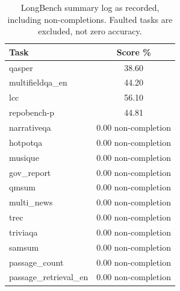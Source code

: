 \begin{table}[t]
\centering\small
\caption{LongBench summary log as recorded, including non-completions. Faulted tasks are excluded, not zero accuracy.}
\label{tab:downstream_results}
\begin{tabular}{@{}lc@{}}
\toprule
Task & Score \% \\
\midrule
qasper & 38.60 \\
multifieldqa\_en & 44.20 \\
lcc & 56.10 \\
repobench-p & 44.81 \\
narrativeqa & 0.00 non-completion \\
hotpotqa & 0.00 non-completion \\
musique & 0.00 non-completion \\
gov\_report & 0.00 non-completion \\
qmsum & 0.00 non-completion \\
multi\_news & 0.00 non-completion \\
trec & 0.00 non-completion \\
triviaqa & 0.00 non-completion \\
samsum & 0.00 non-completion \\
passage\_count & 0.00 non-completion \\
passage\_retrieval\_en & 0.00 non-completion \\
\bottomrule
\end{tabular}
\end{table}
